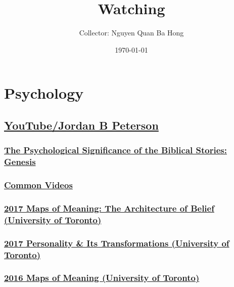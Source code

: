 \documentclass{book}
\title{Watching}
\author{Collector: Nguyen Quan Ba Hong}
\date{\today}
\numberwithin{equation}{section}
\begin{document}
\maketitle
\setcounter{secnumdepth}{6}
\setcounter{tocdepth}{6}
\tableofcontents


\part{Psychology}

\chapter{\href{https://www.youtube.com/user/JordanPetersonVideos}{YouTube/Jordan B Peterson}}

\section{\href{https://www.youtube.com/playlist?list=PL22J3VaeABQD_IZs7y60I3lUrrFTzkpat}{The Psychological Significance of the Biblical Stories: Genesis}}

\section{\href{https://www.youtube.com/c/JordanPetersonVideos/videos?view=0&sort=p&shelf_id=0}{Common Videos}}

\section{\href{https://www.youtube.com/playlist?list=PL22J3VaeABQAT-0aSPq-OKOpQlHyR4k5h}{2017 Maps of Meaning: The Architecture of Belief (University of Toronto)}}

\section{\href{https://www.youtube.com/playlist?list=PL22J3VaeABQApSdW8X71Ihe34eKN6XhCi}{2017 Personality \& Its Transformations (University of Toronto)}}

\section{\href{https://www.youtube.com/playlist?list=PL22J3VaeABQAGbKJNDrRa6GNL0iL4KoOj}{2016 Maps of Meaning (University of Toronto)}}
\end{document}
